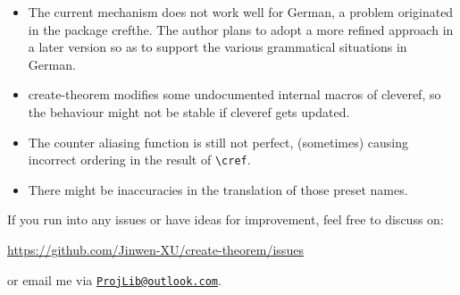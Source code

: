 \documentclass[classical]{einfart}
\newcommand{\createtheorempackage}{\textsf{create-theorem}}
\begin{document}
\begin{itemize}
    \item The current mechanism does not work well for German, a problem originated in the package \textsf{crefthe}. The author plans to adopt a more refined approach in a later version so as to support the various grammatical situations in German.
    \item \createtheorempackage{} modifies some undocumented internal macros of \textsf{cleveref}, so the behaviour might not be stable if \textsf{cleveref} gets updated.
    \item The counter aliasing function is still not perfect, (sometimes) causing incorrect ordering in the result of \lstinline|\cref|.
    \item There might be inaccuracies in the translation of those preset names.
\end{itemize}

\medskip
If you run into any issues or have ideas for improvement, feel free to discuss on:
\begin{center}
    \url{https://github.com/Jinwen-XU/create-theorem/issues}
\end{center}
or email me via \href{mailto:ProjLib@outlook.com}{\texttt{ProjLib@outlook.com}}.
\end{document}
